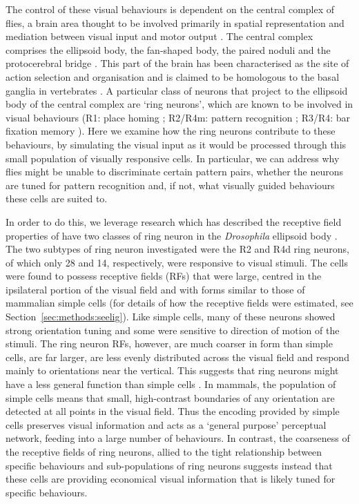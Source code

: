 \documentclass[10pt]{article}
\begin{document}
The control of these visual behaviours is dependent on the central complex of flies, a brain area thought to be involved primarily in spatial representation and mediation between visual input and motor output \cite{Pfeiffer2014}. The central complex comprises the ellipsoid body, the fan-shaped body, the paired noduli and the protocerebral bridge \cite{Young2010}. This part of the brain has been characterised as the site of action selection and organisation and is claimed to be homologous to the basal ganglia in vertebrates \cite{Strausfeld2013}. A particular class of neurons that project to the ellipsoid body of the central complex are `ring neurons', which are known to be involved in visual behaviours (R1: place homing \cite{Sitaraman2008,Sitaraman2010,Ofstad2011}; R2/R4m: pattern recognition \cite{Ernst1999,Liu2006,Pan2009}; R3/R4: bar fixation memory \cite{Neuser2008}). Here we examine how the ring neurons contribute to these behaviours, by simulating the visual input as it would be processed through this small population of visually responsive cells. In particular, we can address why flies might be unable to discriminate certain pattern pairs, whether the neurons are tuned for pattern recognition and, if not, what visually guided behaviours these cells are suited to.

In order to do this, we leverage research which has described the receptive field properties of have two classes of ring neuron in the \emph{Drosophila} ellipsoid body \cite{Seelig2013}. The two subtypes of ring neuron investigated were the R2 and R4d ring neurons, of which only 28 and 14, respectively, were responsive to visual stimuli. The cells were found to possess receptive fields (RFs) that were large, centred in the ipsilateral portion of the visual field and with forms similar to those of mammalian simple cells \cite{Hubel1962} (for details of how the receptive fields were estimated, see Section~\ref{sec:methods:seelig}). Like simple cells, many of these neurons showed strong orientation tuning and some were sensitive to direction of motion of the stimuli. The ring neuron RFs, however, are much coarser in form than simple cells, are far larger, are less evenly distributed across the visual field and respond mainly to orientations near the vertical. This suggests that ring neurons might have a less general function than simple cells \cite{Wystrach2014}. In mammals, the population of simple cells means that small, high-contrast boundaries of any orientation are detected at all points in the visual field. Thus the encoding provided by simple cells preserves visual information and acts as a `general purpose' perceptual network, feeding into a large number of behaviours. In contrast, the coarseness of the receptive fields of ring neurons, allied to the tight relationship between specific behaviours and sub-populations of ring neurons suggests instead that these cells are providing economical visual information that is likely tuned for specific behaviours.
\end{document}
